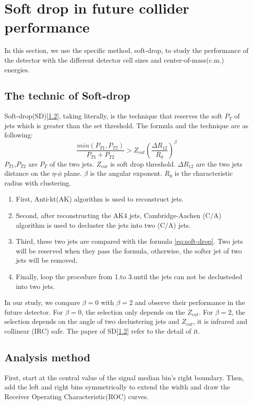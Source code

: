 \section{Soft drop in future collider performance}
In this section, we use the specific method, soft-drop, to study the performance of the detector with the different detector cell sizes and center-of-mass(c.m.) energies. 
\subsection{The technic of Soft-drop}
Soft-drop(SD)[\ref{}], taking literally, is the technique that reserves the soft $P_{T}$ of jets which is greater than the set threshold. The formula and the technique are as following:
\begin{equation} \label{eq:soft-drop}
\frac{min(P_{T1},P_{T2})}{P_{T1}+P_{T2}}>Z_{cut}(\frac{\Delta R_{12}}{R_{0}})^{\beta}
\end{equation}
$P_{T1}$,$P_{T2}$ are $P_{T}$ of the two jets. $Z_{cut}$ is soft drop threshold. $\Delta R_{12}$ are the two jets distance on the $\eta$-$\phi$ plane. $\beta$ is the angular exponent. $R_{0}$ is the characteristic radius with clustering.
\begin{enumerate}
\item First, Anti-kt(AK) algorithm is used to reconstruct jets.
\item Second, after reconstructing the AK4 jets, Cambridge-Aachen (C/A) algorithm is used to decluster the jets into two (C/A) jets.
\item Third, these two jets are compared with the formula \ref{eq:soft-drop}. Two jets will be reserved when they pass the formula, otherwise, the softer jet of two jets will be removed.
\item Finally, loop the procedure from 1.to 3.until the jets can not be declusteded into two jets.
\end{enumerate}
In our study, we compare $\beta=0$ with $\beta=2$ and observe their performance in the future detector. For $\beta=0$, the selection only depends on the $Z_{cut}$. For $\beta=2$, the selection depends on the angle of two declustering jets and $Z_{cut}$, it is infrared and collinear (IRC) safe. The paper of SD[\ref{}] refer to the detail of it.   
\subsection{Analysis method}
First, start at the central value of the signal median bin's right boundary. Then, add the left and right bins symmetrically to extend the width and draw the Receiver Operating Characteristic(ROC) curves.

